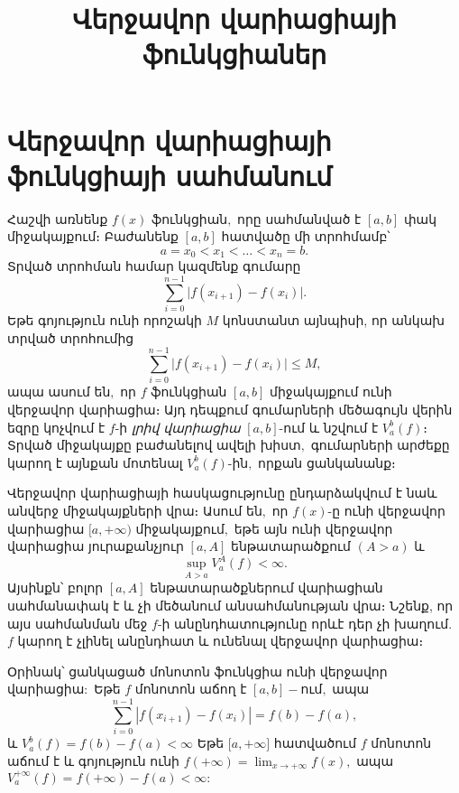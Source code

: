 \documentclass[12pt]{article}
\begin{document}
\title{Վերջավոր վարիացիայի ֆունկցիաներ}
\author{}
\date{}
\maketitle

\section{Վերջավոր վարիացիայի ֆունկցիայի սահմանում}
Հաշվի առնենք \(f(x)\) ֆունկցիան\(,\) որը սահմանված է \([a,b]\) փակ միջակայքում։ Բաժանենք \([a,b]\) հատվածը մի տրոհմամբ՝
\[
a = x_0 < x_1 < \dots < x_n = b.
\]
Տրված տրոհման համար կազմենք գումարը
\begin{equation}\label{eq:var-sum}
\sum_{i=0}^{n-1} \bigl|f(x_{i+1}) - f(x_i)\bigr|.
\end{equation}
Եթե գոյություն ունի որոշակի \(M\) կոնստանտ այնպիսի, որ անկախ տրված տրոհումից
\[
\sum_{i=0}^{n-1} \bigl|f(x_{i+1}) - f(x_i)\bigr| \le M,
\]
ապա ասում են\(,\) որ \(f\) ֆունկցիան \([a,b]\) միջակայքում ունի վերջավոր վարիացիա\(։\) Այդ դեպքում գումարների մեծագույն վերին եզրը կոչվում է \(f\)-ի \emph{լրիվ վարիացիա} \([a,b]\)-ում և նշվում է \(V_a^b(f)։\) Տրված միջակայքը բաժանելով ավելի խիստ\(,\) գումարների արժեքը կարող է այնքան մոտենալ \(V_a^b(f)\)-ին\(,\) որքան ցանկանանք\(։\)

Վերջավոր վարիացիայի հասկացությունը ընդարձակվում է նաև անվերջ միջակայքների վրա։ Ասում են\(,\) որ \( f(x) \)-ը ունի վերջավոր վարիացիա \( [a, +\infty) \) միջակայքում\(,\) եթե այն ունի վերջավոր վարիացիա յուրաքանչյուր \( [a, A] \) ենթատարածքում \( (A > a) \) և
\[
\sup_{A > a} V_a^A(f) < \infty.
\]
Այսինքն՝ բոլոր \( [a, A] \) ենթատարածքներում վարիացիան սահմանափակ է և չի մեծանում անսահմանության վրա։ Նշենք, որ այս սահմանման մեջ \( f \)-ի անընդհատությունը որևէ դեր չի խաղում. \( f \) կարող է չլինել անընդհատ և ունենալ վերջավոր վարիացիա։


Օրինակ՝ ցանկացած մոնոտոն ֆունկցիա ունի վերջավոր վարիացիա\(:\) Եթե \(f\) մոնոտոն աճող է \([a,b]-\)ում\(,\) ապա
\[
\sum_{i=0}^{n-1} |f(x_{i+1})-f(x_i)| = f(b)-f(a),
\]
և \(V_a^b(f)=f(b)-f(a)<\infty\) Եթե \([\)\(a,+\)\(\infty\)\(]\) հատվածում \(f\) մոնոտոն աճում է և գոյություն ունի \(f(+\infty)=\lim_{x\to+\infty}f(x)\)\(,\) ապա \(V_a^{+\infty}(f)=f(+\infty)-f(a)<\infty\)\(:\)
\end{document}
